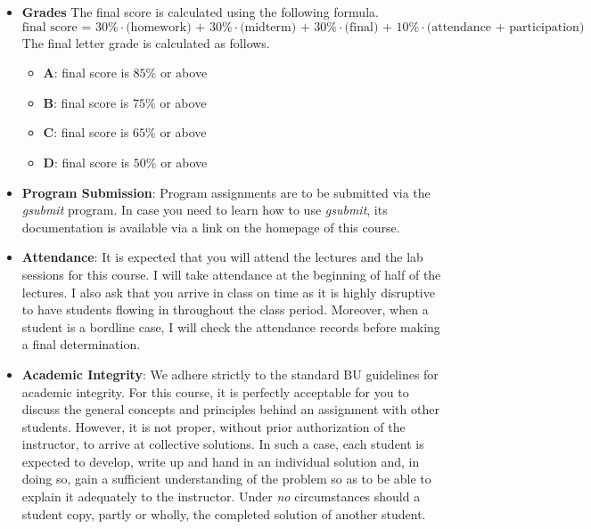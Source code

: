 \documentclass[11pt]{article}
\begin{document}
\begin{itemize}
\item {\bf Grades}
The final score is calculated using the following formula.
\[\mbox{final score = 30\%$\cdot$(homework) + 30\%$\cdot$(midterm) + 30\%$\cdot$(final) + 10\%$\cdot$(attendance + participation)}\]
The final letter grade is calculated as follows.
\begin{itemize}
\item{\bf A}: final score is $85\%$ or above
\item{\bf B}: final score is $75\%$ or above
\item{\bf C}: final score is $65\%$ or above
\item{\bf D}: final score is $50\%$ or above
\end{itemize}

\item
{\bf Program Submission}: Program assignments are to be submitted via the
{\em gsubmit} program. In case you need to learn how to use {\em gsubmit},
its documentation is available via a link on the homepage of this course.

\item
{\bf Attendance}: It is expected that you will attend the lectures and the
lab sessions for this course. I will take attendance at the beginning of
half of the lectures. I also ask that you arrive in class on time as it is
highly disruptive to have students flowing in throughout the class period.
Moreover, when a student is a bordline case, I will check the attendance
records before making a final determination.

\item
{\bf Academic Integrity}: We adhere strictly to the standard BU guidelines
for academic integrity. For this course, it is perfectly acceptable for you
to discuss the general concepts and principles behind an assignment with
other students. However, it is not proper, without prior authorization of
the instructor, to arrive at collective solutions. In such a case, each
student is expected to develop, write up and hand in an individual solution
and, in doing so, gain a sufficient understanding of the problem so as to
be able to explain it adequately to the instructor.  Under {\em no}
circumstances should a student copy, partly or wholly, the completed
solution of another student.

\end{itemize}
\end{document}
